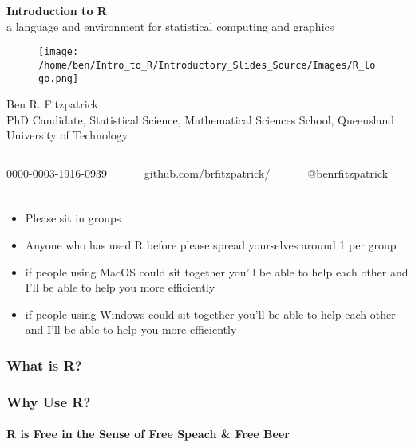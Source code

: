 \documentclass[xcolor=dvipsnames]{beamer}
\begin{document}
\begin{frame} %
\textbf{\huge Introduction to R}\\
a language and environment for statistical computing and graphics %

\begin{figure}
\texttt{[image: /home/ben/Intro\_to\_R/Introductory\_Slides\_Source/Images/R\_logo.png]}
\end{figure}
\small Ben R. Fitzpatrick\\
\tiny PhD Candidate, Statistical Science, Mathematical Sciences School, Queensland University of Technology
\newline
\begin{columns}
\begin{column}{3cm}
\tiny 0000-0003-1916-0939
\end{column}
\begin{column}{3cm}
\tiny github.com/brfitzpatrick/
\end{column}
\begin{column}{3cm}
\tiny @benrfitzpatrick
\end{column}
\end{columns}
\end{frame}

\begin{frame} 
\frametitle{}
\begin{itemize}
\item Please sit in groups
\item Anyone who has used R before please spread yourselves around 1 per group
\item if people using MacOS could sit together you'll be able to help each other and I'll be able to help you more efficiently
\item if people using Windows could sit together you'll be able to help each other and I'll be able to help you more efficiently
\end{itemize}

\end{frame}



\begin{frame} 
\frametitle{What is R?}
\end{frame}

\begin{frame} 
\frametitle{Why Use R?}
\framesubtitle{R is Free in the Sense of Free Speach \& Free Beer}
\end{frame}
\end{document}
